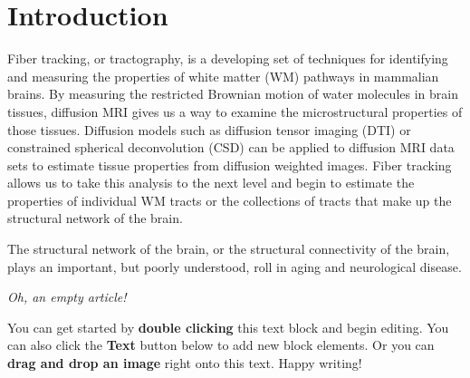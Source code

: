 \section{Introduction}
    Fiber tracking, or tractography, is a developing set of techniques for identifying and measuring the properties of white matter (WM) pathways in mammalian brains. By measuring the restricted Brownian motion of water molecules in brain tissues, diffusion MRI gives us a way to examine the microstructural properties of those tissues. Diffusion models such as diffusion tensor imaging (DTI) or constrained spherical deconvolution (CSD) can be applied to diffusion MRI data sets to estimate tissue properties from diffusion weighted images. Fiber tracking allows us to take this analysis to the next level and begin to estimate the properties of individual WM tracts or the collections of tracts that make up the structural network of the brain.
    
    The structural network of the brain, or the structural connectivity of the brain, plays an important, but poorly understood, roll in aging and neurological disease.  

\textit{Oh, an empty article!}

You can get started by \textbf{double clicking} this text block and begin editing. You can also click the \textbf{Text} button below to add new block elements. Or you can \textbf{drag and drop an image} right onto this text. Happy writing!
